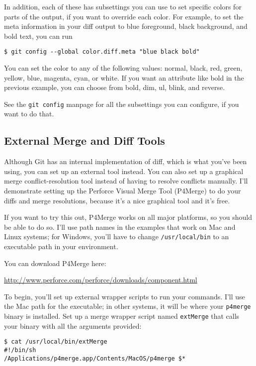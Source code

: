 \documentclass[a4paper]{book}
\newcounter{tab}[chapter]
\begin{document}
In addition, each of these has subsettings you can use to set specific colors for parts of the output, if you want to override each color. For example, to set the meta information in your diff output to blue foreground, black background, and bold text, you can run

\begin{shaded}\begin{verbatim}
$ git config --global color.diff.meta "blue black bold"
\end{verbatim}\end{shaded}

You can set the color to any of the following values: normal, black, red, green, yellow, blue, magenta, cyan, or white. If you want an attribute like bold in the previous example, you can choose from bold, dim, ul, blink, and reverse.

See the \texttt{git config} manpage for all the subsettings you can configure, if you want to do that.

\subsection{External Merge and Diff Tools}\label{external-merge-and-diff-tools}

Although Git has an internal implementation of diff, which is what you've been using, you can set up an external tool instead. You can also set up a graphical merge conflict-resolution tool instead of having to resolve conflicts manually. I'll demonstrate setting up the Perforce Visual Merge Tool (P4Merge) to do your diffs and merge resolutions, because it's a nice graphical tool and it's free.

If you want to try this out, P4Merge works on all major platforms, so you should be able to do so. I'll use path names in the examples that work on Mac and Linux systems; for Windows, you'll have to change \texttt{/usr/local/bin} to an executable path in your environment.

You can download P4Merge here:

\url{http://www.perforce.com/perforce/downloads/component.html}

To begin, you'll set up external wrapper scripts to run your commands. I'll use the Mac path for the executable; in other systems, it will be where your \texttt{p4merge} binary is installed. Set up a merge wrapper script named \texttt{extMerge} that calls your binary with all the arguments provided:

\begin{shaded}\begin{verbatim}
$ cat /usr/local/bin/extMerge
#!/bin/sh
/Applications/p4merge.app/Contents/MacOS/p4merge $*
\end{verbatim}\end{shaded}
\end{document}
